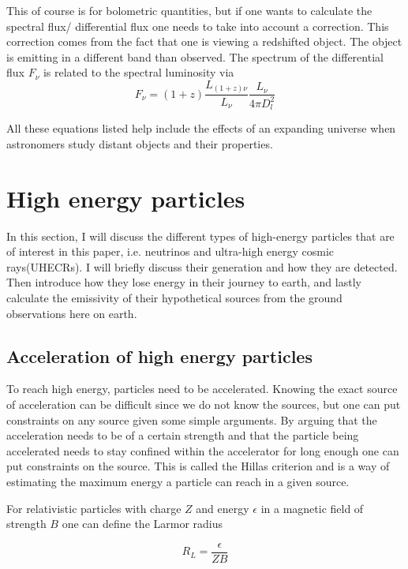 \documentclass{article}
\begin{document}
This of course is for bolometric quantities, but if one wants to calculate the spectral 
flux/ differential flux one needs to take into account a correction. This correction comes 
from the fact that one is viewing a redshifted object. The object is emitting in a different band than 
observed. The spectrum of the differential flux $F_\nu$ is related to the spectral luminosity via
\begin{equation}
    F_\nu = (1+z) \frac{L_{(1+z)\nu}}{L_\nu}\frac{L_\nu}{4\pi D_l^2}
\end{equation}


All these equations listed help include the effects of an expanding universe when astronomers study distant objects and their properties. 

\section{High energy particles}
In this section, I will discuss the different types of high-energy particles that are of interest in this paper, i.e. neutrinos and ultra-high energy cosmic rays(UHECRs).
I will briefly discuss their generation and how they are detected. Then introduce how they lose energy in their journey to earth, and lastly calculate the emissivity of their hypothetical sources from the ground 
observations here on earth. 

\subsection{Acceleration of high energy particles}

To reach high energy, particles need to be accelerated. 
Knowing the exact source of acceleration can be difficult since we do not know the sources, but one can put constraints on any source given some simple arguments.
By arguing that the acceleration needs to be of a certain strength and that the particle being accelerated needs to stay confined within the accelerator for long enough one can put constraints on the source.
This is called the Hillas criterion and is a way of estimating the maximum energy a particle can reach in a given source.%

For relativistic particles with charge $Z$ and energy $\epsilon$ in a magnetic field of strength $B$ one can define the Larmor radius


\begin{equation}
    R_L = \frac{\epsilon}{ZB}
\end{equation}
\end{document}
